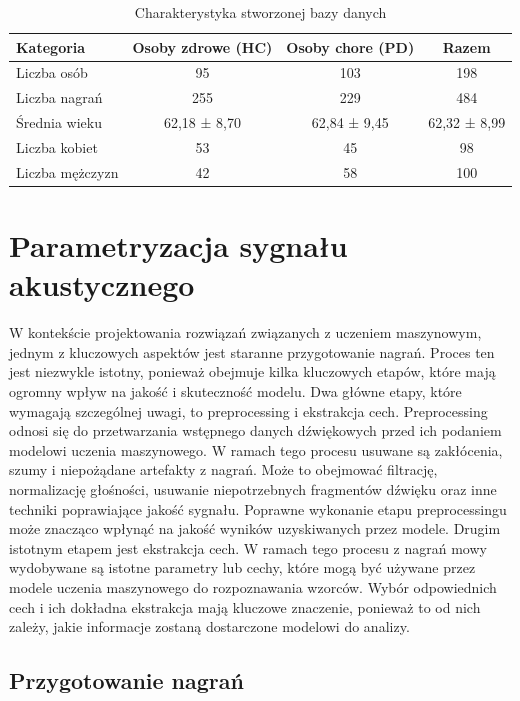 \begin{table}[h]
\centering
\caption{Charakterystyka stworzonej bazy danych}
\label{tab:summary-database}
\begin{tabular}{|l|c|c|c|}
\hline
\textbf{Kategoria} &\textbf{Osoby zdrowe (HC)} &\textbf{Osoby chore (PD)} &\textbf{Razem} \\ \hline
Liczba osób &95 &103 &198\\ \hline
Liczba nagrań &255 &229 &484\\ \hline
Średnia wieku & 62,18 ± 8,70 & 62,84 ± 9,45  & 62,32 ± 8,99 \\ \hline
Liczba kobiet &53 &45 &98\\ \hline
Liczba mężczyzn &42 &58 &100 \\ \hline
\end{tabular}
\end{table}

\section{Parametryzacja sygnału akustycznego}
\label{sec:parametryzacja-sygnalu-akustycznego}

W kontekście projektowania rozwiązań związanych z uczeniem maszynowym, jednym z kluczowych aspektów jest staranne przygotowanie nagrań.
Proces ten jest niezwykle istotny, ponieważ obejmuje kilka kluczowych etapów, które mają ogromny wpływ na jakość i skuteczność modelu.
Dwa główne etapy, które wymagają szczególnej uwagi, to preprocessing i ekstrakcja cech.
Preprocessing odnosi się do przetwarzania wstępnego danych dźwiękowych przed ich podaniem modelowi uczenia maszynowego.
W ramach tego procesu usuwane są zakłócenia, szumy i niepożądane artefakty z nagrań.
Może to obejmować filtrację, normalizację głośności, usuwanie niepotrzebnych fragmentów dźwięku oraz inne techniki poprawiające jakość sygnału.
Poprawne wykonanie etapu preprocessingu może znacząco wpłynąć na  jakość wyników uzyskiwanych przez modele.
Drugim istotnym etapem jest ekstrakcja cech.
W ramach tego procesu z nagrań mowy wydobywane są istotne parametry lub cechy, które mogą być używane przez modele uczenia maszynowego do rozpoznawania wzorców.
Wybór odpowiednich cech i ich dokładna ekstrakcja mają kluczowe znaczenie, ponieważ to od nich zależy, jakie informacje zostaną dostarczone modelowi do analizy.

\subsection{Przygotowanie nagrań}
\label{subsec:preprocessing}

